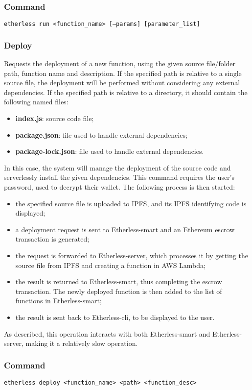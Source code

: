 	\subsubsection*{Command}
	\texttt{etherless run <function\_name> [---params] [parameter\_list]}
	\subsubsection{Deploy}
	Requests the deployment of a new function, using the given source file/folder path, function name and description. If the specified path is relative to a single source file, the deployment will be performed without considering any external dependencies. If the specified path is relative to a directory, it should contain the following named files:
	\begin{itemize}
		\item \textbf{index.js}: source code file;
		\item \textbf{package.json}: file used to handle external dependencies;
		\item \textbf{package-lock.json}: file used to handle external dependencies.
	\end{itemize}
	In this case, the system will manage the deployment of the source code and serverlessly install the given dependencies.
	This command requires the user's password, used to decrypt their wallet. The following process is then started:
	\begin{itemize}
		\item the specified source file is uploaded to IPFS, and its IPFS identifying code is displayed;
		\item a deployment request is sent to Etherless-smart and an Ethereum escrow transaction is generated;
		\item the request is forwarded to Etherless-server, which processes it by getting the source file from IPFS and creating a function in AWS Lambda;
		\item the result is returned to Etherless-smart, thus completing the escrow transaction. The newly deployed function is then added to the list of functions in Etherless-smart;
		\item the result is sent back to Etherless-cli, to be displayed to the user.
	\end{itemize}
	As described, this operation interacts with both Etherless-smart and Etherless-server, making it a relatively slow operation.
	\subsubsection*{Command}
	\texttt{etherless deploy <function\_name> <path>  <function\_desc>}
